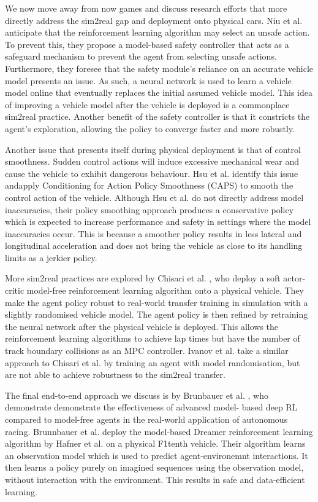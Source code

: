 We now move away from now games and discuss research efforts that more directly address the sim2real gap and deployment onto physical cars.
Niu et al. \cite{Niu2020} anticipate that the reinforcement learning algorithm may select an unsafe action.
To prevent this, they propose a model-based safety controller that acts as a safeguard mechanism to prevent the agent from selecting unsafe actions.
Furthermore, they foresee that the safety module's reliance on an accurate vehicle model presents an issue. 
As such, a neural network is used to learn a vehicle model online that eventually replaces the initial assumed vehicle model.
This idea of improving a vehicle model after the vehicle is deployed is a commonplace sim2real practice.
Another benefit of the safety controller is that it constricts the agent's exploration, allowing the policy to converge faster and more robustly.


Another issue that presents itself during physical deployment is that of control smoothness. 
Sudden control actions will induce excessive mechanical wear and cause the vehicle to exhibit dangerous behaviour.
Hsu et al. \cite{hsu2022} identify this issue andapply Conditioning for Action Policy Smoothness (CAPS) to smooth the control action of the vehicle.
Although Hsu et al. \cite{hsu2022} do not directly address model inaccuracies, their policy smoothing approach produces a conservative policy which is expected to increase performance and safety in settings where the model inaccuracies occur.
This is because a smoother policy results in less lateral and longitudinal acceleration and does not bring the vehicle as close to its handling limits as a jerkier policy.


More sim2real practices are explored by Chisari et al. \cite{Chisari2021}, who deploy a soft actor-critic model-free reinforcement learning algorithm onto a physical vehicle.
They make the agent policy robust to real-world transfer training in simulation with a slightly randomised vehicle model.
The agent policy is then refined by retraining the neural network after the physical vehicle is deployed.
This allows the reinforcement learning algorithms to achieve lap times but have the number of track boundary collisions as an MPC controller.
Ivanov et al. \cite{Ivanov2020} take a similar approach to Chisari et al. \cite{Chisari2021} by training an agent with model randomisation, but are not able to achieve robustness to the sim2real transfer.

The final end-to-end approach we discuss is by Brunbauer et al. \cite{brunnbauer}, who demonstrate demonstrate the effectiveness of advanced model- based deep RL compared to model-free agents in the real-world application of autonomous racing.
Brunnbauer et al. \cite{brunnbauer} deploy the model-based Dreamer reinforcement learning algorithm by Hafner et al. \cite{Hafner2019a} on a physical F1tenth vehicle.
Their algorithm learns an observation model which is used to predict agent-environemnt interactions.
It then learns a policy purely on imagined sequences using the observation model, without interaction with the environment.
This results in safe and data-efficient learning.

